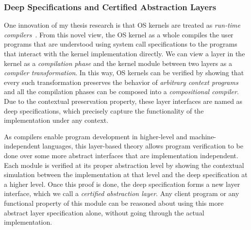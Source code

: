\documentclass[a4paper, 10pt]{article}
\begin{document}
\begin{small}
\subsubsection*{\small Deep Specifications and Certified Abstraction Layers}
\begin{comment}
Modern OS kernels are designed and constructed using a
stack of \emph{abstraction layers},
each of which defines an interface that hides the underlying implementation
details. Client programs can be understood solely based on the interface,
independent of the layer implementation. Despite their huge contributions
to the computer industry,
abstraction layers have mostly been treated as a system
concept; before our work, they have almost never been formally specified or verified.
\end{comment}
One innovation of my thesis research is that  OS kernels are treated as \emph{run-time compilers}~\cite{popl15-gu}.
From this novel view,
the OS kernel as a whole compiles the
user programs that are understood using system call specifications  to the programs that interact 
with the kernel implementation directly.
We can view a layer in the kernel as a \emph{compilation phase}
and the kernel module between two layers as a \emph{compiler transformation}.
In this way,  OS kernels can be verified by showing that
every such transformation
preserves the behavior of \emph{arbitrary context programs}
and all the compilation phases can be composed into a \emph{compositional compiler}.
Due to the contextual preservation property,
these layer interfaces are named
as deep specifications, which precisely capture the functionality of the implementation under any context.


As compilers enable program development
in higher-level and machine-independent languages,
this layer-based theory allows program verification to be done
over some more abstract interfaces that are implementation independent. Each module is verified
at its proper abstraction level by showing the contextual
simulation between the implementation at that level
and the deep specification at a higher level.
Once this proof is done, the deep specification forms a new layer interface, which we call a \emph{certified abstraction layer}.
Any client program or any functional property of this module
can be reasoned about using this more abstract  layer specification alone, without going through the actual implementation.


\end{small}
\end{document}
